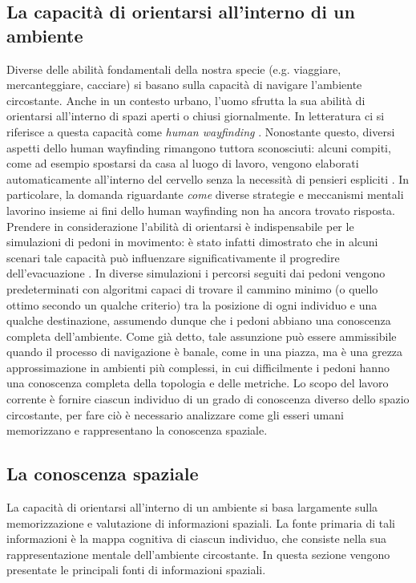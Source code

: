 \documentclass[12pt,a4paper,openright,oneside]{book}
\begin{document}
\subsection{La capacità di orientarsi all'interno di un ambiente}
Diverse delle abilità fondamentali della nostra specie (e.g. viaggiare, mercanteggiare, cacciare) si basano sulla capacità di navigare l’ambiente circostante. Anche in un contesto urbano, l’uomo sfrutta la sua abilità di orientarsi all’interno di spazi aperti o chiusi giornalmente. In letteratura ci si riferisce a questa capacità come \emph{human wayfinding} \cite{Andresen2018}. Nonostante questo, diversi aspetti dello human wayfinding rimangono tuttora sconosciuti: alcuni compiti, come ad esempio spostarsi da casa al luogo di lavoro, vengono elaborati automaticamente all'interno del cervello senza la necessità di pensieri espliciti \cite{MontelloWayfinding2006}. In particolare, la domanda riguardante \emph{come} diverse strategie e meccanismi mentali lavorino insieme ai fini dello human wayfinding non ha ancora trovato risposta.
Prendere in considerazione l’abilità di orientarsi è indispensabile per le simulazioni di pedoni in movimento: è stato infatti dimostrato che in alcuni scenari tale capacità può influenzare significativamente il progredire dell’evacuazione \cite{AndresenWayfinding2016}. In diverse simulazioni i percorsi seguiti dai pedoni vengono predeterminati con algoritmi capaci di trovare il cammino minimo (o quello ottimo secondo un qualche criterio) tra la posizione di ogni individuo e una qualche destinazione, assumendo dunque che i pedoni abbiano una conoscenza completa dell’ambiente. Come già detto, tale assunzione può essere ammissibile quando il processo di navigazione è banale, come in una piazza, ma è una grezza approssimazione in ambienti più complessi, in cui difficilmente i pedoni hanno una conoscenza completa della topologia e delle metriche. Lo scopo del lavoro corrente è fornire ciascun individuo di un grado di conoscenza diverso dello spazio circostante, per fare ciò è necessario analizzare come gli esseri umani memorizzano e rappresentano la conoscenza spaziale.

\subsection{La conoscenza spaziale}
\label{spatial-knowledge}
La capacità di orientarsi all’interno di un ambiente si basa largamente sulla memorizzazione e valutazione di informazioni spaziali. La fonte primaria di tali informazioni è la mappa cognitiva di ciascun individuo, che consiste nella sua rappresentazione mentale dell’ambiente circostante. In questa sezione vengono presentate le principali fonti di informazioni spaziali.
\end{document}
